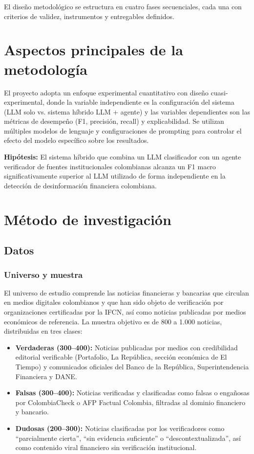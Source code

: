 El diseño metodológico se estructura en cuatro fases secuenciales, cada una con criterios de validez, instrumentos y entregables definidos.

\section{Aspectos principales de la metodología}

El proyecto adopta un enfoque experimental cuantitativo con diseño cuasi-experimental, donde la variable independiente es la configuración del sistema (LLM solo vs. sistema híbrido LLM + agente) y las variables dependientes son las métricas de desempeño (F1, precisión, recall) y explicabilidad. Se utilizan múltiples modelos de lenguaje y configuraciones de prompting para controlar el efecto del modelo específico sobre los resultados.

\textbf{Hipótesis:} El sistema híbrido que combina un LLM clasificador con un agente verificador de fuentes institucionales colombianas alcanza un F1 macro significativamente superior al LLM utilizado de forma independiente en la detección de desinformación financiera colombiana.

\section{Método de investigación}

\subsection{Datos}

\subsubsection{Universo y muestra}

El universo de estudio comprende las noticias financieras y bancarias que circulan en medios digitales colombianos y que han sido objeto de verificación por organizaciones certificadas por la IFCN, así como noticias publicadas por medios económicos de referencia. La muestra objetivo es de 800 a 1.000 noticias, distribuidas en tres clases:

\begin{itemize}
    \item \textbf{Verdaderas (300--400):} Noticias publicadas por medios con credibilidad editorial verificable (Portafolio, La República, sección económica de El Tiempo) y comunicados oficiales del Banco de la República, Superintendencia Financiera y DANE.
    \item \textbf{Falsas (300--400):} Noticias verificadas y clasificadas como falsas o engañosas por ColombiaCheck o AFP Factual Colombia, filtradas al dominio financiero y bancario.
    \item \textbf{Dudosas (200--300):} Noticias clasificadas por los verificadores como ``parcialmente cierta'', ``sin evidencia suficiente'' o ``descontextualizada'', así como contenido viral financiero sin verificación institucional.
\end{itemize}

